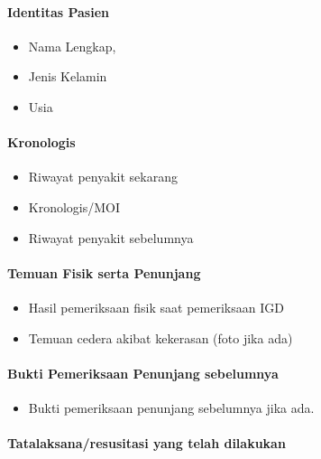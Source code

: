 \documentclass[
]{book}
\providecommand{\tightlist}{%
  \setlength{\itemsep}{0pt}\setlength{\parskip}{0pt}}
\begin{document}
\hypertarget{identitas-pasien-3}{%
\paragraph{Identitas Pasien}\label{identitas-pasien-3}}

\begin{itemize}
\item
  Nama Lengkap,
\item
  Jenis Kelamin
\item
  Usia
\end{itemize}

\hypertarget{kronologis-2}{%
\paragraph{Kronologis}\label{kronologis-2}}

\begin{itemize}
\item
  Riwayat penyakit sekarang
\item
  Kronologis/MOI
\item
  Riwayat penyakit sebelumnya
\end{itemize}

\hypertarget{temuan-fisik-serta-penunjang-2}{%
\paragraph{Temuan Fisik serta Penunjang}\label{temuan-fisik-serta-penunjang-2}}

\begin{itemize}
\item
  Hasil pemeriksaan fisik saat pemeriksaan IGD
\item
  Temuan cedera akibat kekerasan (foto jika ada)
\end{itemize}

\hypertarget{bukti-pemeriksaan-penunjang-sebelumnya-3}{%
\paragraph{Bukti Pemeriksaan Penunjang sebelumnya}\label{bukti-pemeriksaan-penunjang-sebelumnya-3}}

\begin{itemize}
\tightlist
\item
  Bukti pemeriksaan penunjang sebelumnya jika ada.
\end{itemize}

\hypertarget{tatalaksanaresusitasi-yang-telah-dilakukan-3}{%
\paragraph{Tatalaksana/resusitasi yang telah dilakukan}\label{tatalaksanaresusitasi-yang-telah-dilakukan-3}}
\end{document}

